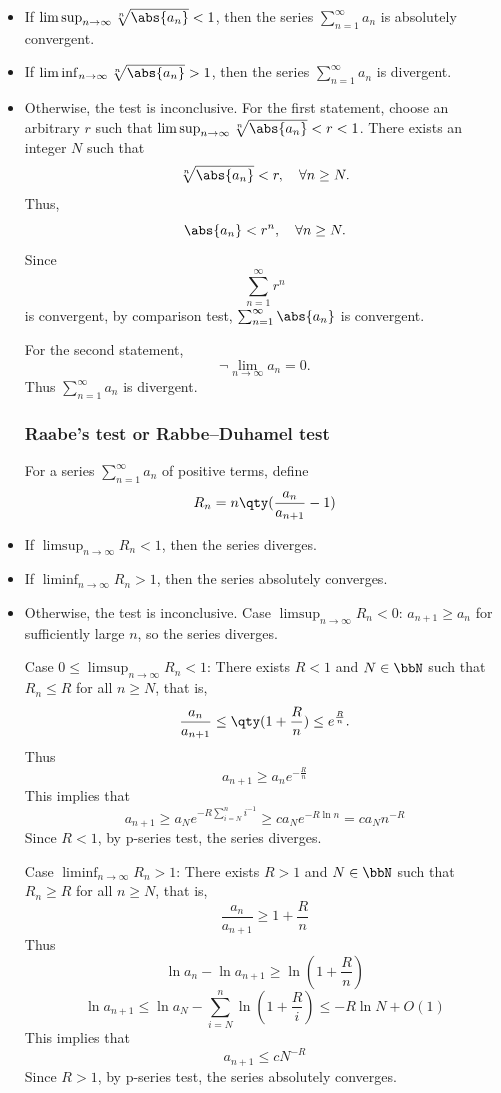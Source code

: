 \documentclass[a4paper,12pt]{report}
\begin{document}
\begin{itemize}
\begin{itemize}
\subsubsection{(Cauchy) root test}
\ben
\item If $\limsup_{n\to\infty}\sqrt[n]{\abs{a_n}}<1$, then the series $\sum_{n=1}^{\infty}a_n$ is absolutely convergent.
\item If $\liminf_{n\to\infty}\sqrt[n]{\abs{a_n}}>1$, then the series $\sum_{n=1}^{\infty}a_n$ is divergent.
\item Otherwise, the test is inconclusive.
\een
\bpr
For the first statement, choose an arbitrary $r$ such that $\limsup_{n\to\infty}\sqrt[n]{\abs{a_n}}<r<1$. There exists an integer $N$ such that
\[\sqrt[n]{\abs{a_n}}<r,\quad\forall n\geq N.\]
Thus,
\[\abs{a_n}<r^n,\quad\forall n\geq N.\]
Since
\[\sum_{n=1}^{\infty}r^n\]
is convergent, by comparison test, $\sum_{n=1}^{\infty}\abs{a_n}$ is convergent.

For the second statement,
\[\neg\lim_{n\to\infty}a_n=0.\]
Thus $\sum_{n=1}^{\infty}a_n$ is divergent.
\epr
\subsubsection{Raabe's test or Rabbe–Duhamel test}
For a series $\sum_{n=1}^{\infty}a_n$ of positive terms, define
\[R_n=n\qty(\frac{a_n}{a_{n+1}}-1)\]
\bit
\item If $\limsup_{n\to\infty}R_n<1$, then the series diverges.
\item If $\liminf_{n\to\infty}R_n>1$, then the series absolutely converges.
\item Otherwise, the test is inconclusive.
\eit
\bpr
Case $\limsup_{n\to\infty}R_n<0$: $a_{n+1}\ge a_n$ for sufficiently large $n$, so the series diverges.

Case $0\le\limsup_{n\to\infty}R_n<1$: There exists $R<1$ and $N\in\bbN$ such that $R_n\le R$ for all $n\ge N$, that is,
\[\frac{a_n}{a_{n+1}}\le\qty(1+\frac{R}{n})\le e^{\frac{R}{n}}.\]
Thus
\[a_{n+1}\ge a_ne^{-\frac{R}{n}}\]
This implies that
\[a_{n+1}\ge a_Ne^{-R\sum_{i=N}^ni^{-1}}\ge ca_Ne^{-R\ln n}=ca_Nn^{-R}\]
Since $R<1$, by p-series test, the series diverges.

Case $\liminf_{n\to\infty}R_n>1$: There exists $R>1$ and $N\in\bbN$ such that $R_n\ge R$ for all $n\ge N$, that is,
\[\frac{a_n}{a_{n+1}}\ge1+\frac{R}{n}\]
Thus
\[\ln a_n-\ln a_{n+1}\ge\ln(1+\frac{R}{n})\]
\[\ln a_{n+1}\le\ln a_N-\sum_{i=N}^n\ln(1+\frac{R}{i})\le -R\ln N+O(1)\]
This implies that
\[a_{n+1}\le cN^{-R}\]
Since $R>1$, by p-series test, the series absolutely converges.
\epr

\end{itemize}
\end{itemize}
\end{document}
